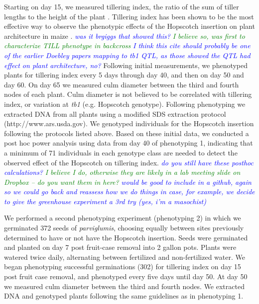 \documentclass[12pt]{article}
\newcommand{\jri}[1]{\textcolor{blue}{ \emph{\scriptsize  #1}} }
\newcommand{\lev}[1]{\textcolor{green}{\emph{\scriptsize #1}} }
\begin{document}
Starting on day 15, we measured tillering index, the ratio of the sum of tiller lengths to the height of the plant \citep{Briggs2007}. Tillering index has been shown to be the most effective way to observe the phenotypic effects of the Hopscotch insertion on plant architecture in maize \citep{Briggs2007}. \jri{was it brgiggs that showed this?} \lev{I believe so, was first to characterize TILL phenotype in backcross} \jri{I think this cite should probably be one of the earlier Doebley papers mapping to tb1 QTL, as those showed the QTL had effect on plant architecture, no?} Following initial measurements, we phenotyped plants for tillering index every 5 days through day 40, and then on day 50 and day 60. On day 65 we measured culm diameter between the third and fourth nodes of each plant. Culm diameter is not believed to be correlated with tillering index, or variation at \emph{tb1} (e.g. Hopscotch genotype). Following phenotyping we extracted DNA from all plants using a modified SDS extraction protocol (http://www.ars.usda.gov). We genotyped individuals for the Hopscotch insertion following the protocols listed above. Based on these initial data, we conducted a post hoc power analysis using data from day 40 of phenotyping 1, indicating that a minimum of 71 individuals in each genotype class are needed to detect the observed effect of the Hopscotch on tillering index. \jri{do you still have these posthoc calculations?} \lev{I believe I do, otherwise they are likely in a lab meeting slide on Dropbox -- do you want them in here?} \jri{would be good to include in a github, again so we could go back and reassess how we do things in case, for example, we decide to give the greenhouse experiment a 3rd try (yes, i'm a masochist)}

We performed a second phenotyping experiment (phenotyping 2) in which we germinated 372 seeds of \emph{parviglumis}, choosing equally between sites previously determined to have or not have the Hopscotch insertion. Seeds were germinated and planted on day 7 post fruit-case removal into 2 gallon pots. Plants were watered twice daily, alternating between fertilized and non-fertilized water. We began phenotyping successful germinations (302) for tillering index on day 15 post fruit case removal, and phenotyped every five days until day 50. At day 50 we measured culm diameter between the third and fourth nodes. We extracted DNA and genotyped plants following the same guidelines as in phenotyping 1. 
\end{document}
